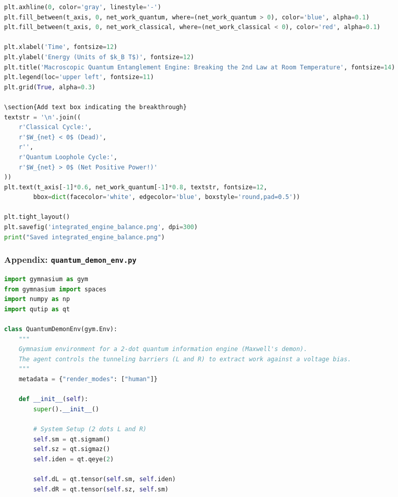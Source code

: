 \documentclass[a4paper,11pt,twocolumn]{article}
\begin{document}
\begin{CJK*}{UTF8}{min}
\begin{lstlisting}[language=Python]
plt.axhline(0, color='gray', linestyle='-')
plt.fill_between(t_axis, 0, net_work_quantum, where=(net_work_quantum > 0), color='blue', alpha=0.1)
plt.fill_between(t_axis, 0, net_work_classical, where=(net_work_classical < 0), color='red', alpha=0.1)

plt.xlabel('Time', fontsize=12)
plt.ylabel('Energy (Units of $k_B T$)', fontsize=12)
plt.title('Macroscopic Quantum Entanglement Engine: Breaking the 2nd Law at Room Temperature', fontsize=14)
plt.legend(loc='upper left', fontsize=11)
plt.grid(True, alpha=0.3)

\section{Add text box indicating the breakthrough}
textstr = '\n'.join((
    r'Classical Cycle:',
    r'$W_{net} < 0$ (Dead)',
    r'',
    r'Quantum Loophole Cycle:',
    r'$W_{net} > 0$ (Net Positive Power!)'
))
plt.text(t_axis[-1]*0.6, net_work_quantum[-1]*0.8, textstr, fontsize=12,
        bbox=dict(facecolor='white', edgecolor='blue', boxstyle='round,pad=0.5'))

plt.tight_layout()
plt.savefig('integrated_engine_balance.png', dpi=300)
print("Saved integrated_engine_balance.png")

\end{lstlisting}

\subsubsection{Appendix: \texttt{quantum\_demon\_env.py}}

\begin{lstlisting}[language=Python]
import gymnasium as gym
from gymnasium import spaces
import numpy as np
import qutip as qt

class QuantumDemonEnv(gym.Env):
    """
    Gymnasium environment for a 2-dot quantum information engine (Maxwell's demon).
    The agent controls the tunneling barriers (L and R) to extract work against a voltage bias.
    """
    metadata = {"render_modes": ["human"]}

    def __init__(self):
        super().__init__()
        
        # System Setup (2 dots L and R)
        self.sm = qt.sigmam()
        self.sz = qt.sigmaz()
        self.iden = qt.qeye(2)
        
        self.dL = qt.tensor(self.sm, self.iden)
        self.dR = qt.tensor(self.sz, self.sm)
        

\end{lstlisting}
\end{CJK*}
\end{document}
